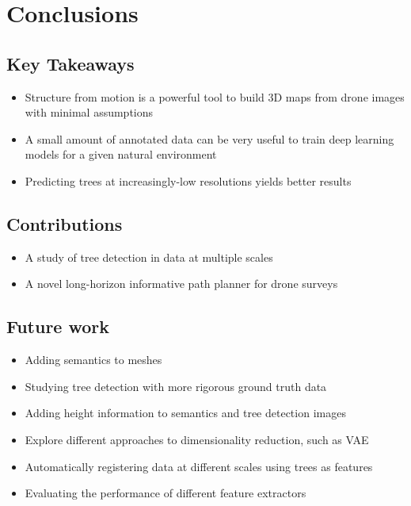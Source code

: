 
\chapter{Conclusions} \label{chapConclusions}
\section{Key Takeaways}
\begin{itemize}
    \item Structure from motion is a powerful tool to build 3D maps from drone images with minimal assumptions
    \item A small amount of annotated data can be very useful to train deep learning models for a given natural environment
    \item Predicting trees at increasingly-low resolutions yields better results 
\end{itemize}
\section{Contributions}
\begin{itemize}
    \item A study of tree detection in data at multiple scales 
    \item A novel long-horizon informative path planner for drone surveys
\end{itemize}
\section{Future work}
\begin{itemize}
    \item Adding semantics to meshes 
    \item Studying tree detection with more rigorous ground truth data
    \item Adding height information to semantics and tree detection images
    \item Explore different approaches to dimensionality reduction, such as VAE
    \item Automatically registering data at different scales using trees as features
    \item Evaluating the performance of different feature extractors
\end{itemize}


